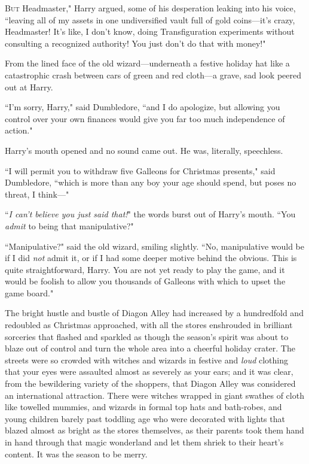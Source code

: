 
\lettrine[ante=``]{B}{ut} Headmaster," Harry argued, some of his desperation leaking into his voice, ``leaving all of my assets in one undiversified vault full of gold coins—it's crazy, Headmaster! It's like, I don't know, doing Transfiguration experiments without consulting a recognized authority! You just don't do that with money!"

From the lined face of the old wizard—underneath a festive holiday hat like a catastrophic crash between cars of green and red cloth—a grave, sad look peered out at Harry.

``I'm sorry, Harry," said Dumbledore, ``and I do apologize, but allowing you control over your own finances would give you far too much independence of action."

Harry's mouth opened and no sound came out. He was, literally, speechless.

``I will permit you to withdraw five Galleons for Christmas presents," said Dumbledore, ``which is more than any boy your age should spend, but poses no threat, I think—"

``\emph{I can't believe you just said that!}" the words burst out of Harry's mouth. ``You \emph{admit} to being that manipulative?"

``Manipulative?" said the old wizard, smiling slightly. ``No, manipulative would be if I did \emph{not} admit it, or if I had some deeper motive behind the obvious. This is quite straightforward, Harry. You are not yet ready to play the game, and it would be foolish to allow you thousands of Galleons with which to upset the game board."

\later

The bright hustle and bustle of Diagon Alley had increased by a hundredfold and redoubled as Christmas approached, with all the stores enshrouded in brilliant sorceries that flashed and sparkled as though the season's spirit was about to blaze out of control and turn the whole area into a cheerful holiday crater. The streets were so crowded with witches and wizards in festive and \emph{loud} clothing that your eyes were assaulted almost as severely as your ears; and it was clear, from the bewildering variety of the shoppers, that Diagon Alley was considered an international attraction. There were witches wrapped in giant swathes of cloth like towelled mummies, and wizards in formal top hats and bath-robes, and young children barely past toddling age who were decorated with lights that blazed almost as bright as the stores themselves, as their parents took them hand in hand through that magic wonderland and let them shriek to their heart's content. It was the season to be merry.

